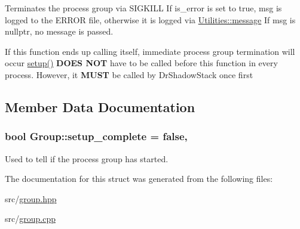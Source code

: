 Terminates the process group via S\+I\+G\+K\+I\+LL If is\+\_\+error is set to true, msg is logged to the E\+R\+R\+OR file, otherwise it is logged via \hyperlink{class_utilities_ae8efd2e8950fe6641d87296b8120d246}{Utilities\+::message} If msg is nullptr, no message is passed. 

If this function ends up calling itself, immediate process group termination will occur \hyperlink{struct_group_a9e2d7e0c56696de4592f1b166188c10a}{setup()} {\bfseries D\+O\+ES N\+OT} have to be called before this function in every process. However, it {\bfseries M\+U\+ST} be called by Dr\+Shadow\+Stack once first 

\subsection{Member Data Documentation}
\subsubsection[{\texorpdfstring{setup\+\_\+complete}{setup_complete}}]{\setlength{\rightskip}{0pt plus 5cm}bool Group\+::setup\+\_\+complete = false\hspace{0.3cm}{\ttfamily [static]}, {\ttfamily [private]}}\hypertarget{struct_group_a35632ca452cfe09fbf723539cd264f58}{}\label{struct_group_a35632ca452cfe09fbf723539cd264f58}


Used to tell if the process group has started. 



The documentation for this struct was generated from the following files\+:\begin{DoxyCompactItemize}
\item 
src/\hyperlink{group_8hpp}{group.\+hpp}\item 
src/\hyperlink{group_8cpp}{group.\+cpp}\end{DoxyCompactItemize}
